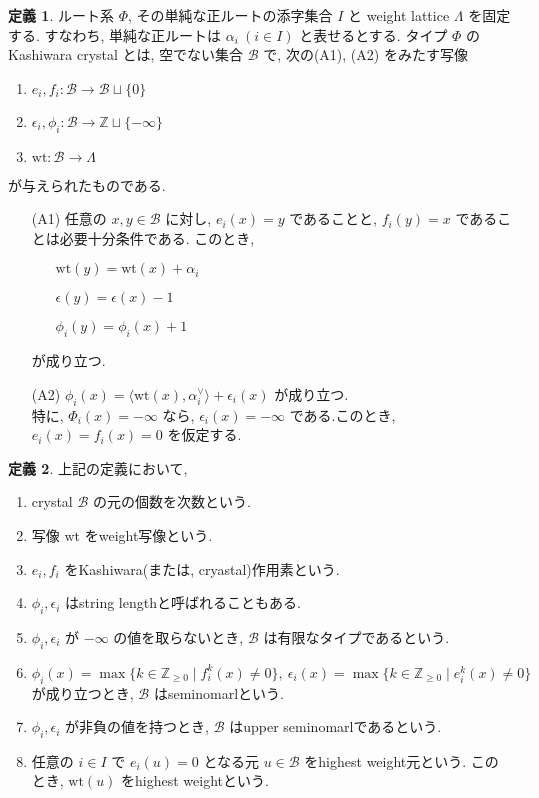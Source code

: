 \documentclass[
  a4paper, 
  12pt,
  ja=standard,
  xelatex,
  left=30truemm,
  right=30truemm,
  titlepage 
]{bxjsarticle}
\theoremstyle{definition}
\newtheorem{df}{定義}
\begin{document}
\begin{df}
  ルート系 $\Phi$, その単純な正ルートの添字集合 $I$ と weight lattice $\Lambda$ を固定する.
  すなわち, 単純な正ルートは $\alpha_i \ ( i \in I )$ と表せるとする.
  タイプ $\Phi$ の Kashiwara crystal とは, 空でない集合 $\mathscr{B}$ で, 次の(A1), (A2)
  をみたす写像
  \begin{enumerate}
    \item $e_i, f_i : \mathscr{B} \to \mathscr{B} \sqcup \{ 0 \}$
    \item $\epsilon_i, \phi_i : \mathscr{B} \to \mathbb{Z} \sqcup \{ - \infty \}$
    \item $\mathrm{wt} : \mathscr{B} \to \Lambda$
  \end{enumerate}
  が与えられたものである.
  \begin{enumerate}
    \item [(A1)] 任意の $x, y \in \mathscr{B}$ に対し, $e_i(x) = y $ であることと, $f_i(y) = x $ であることは必要十分条件である.
    このとき, 
    \begin{enumerate}
      \item [] $\mathrm{wt}(y) = \mathrm{wt}(x) + \alpha_i$
      \item [] $\epsilon(y) = \epsilon(x) - 1$
      \item [] $\phi_i(y) = \phi_i(x) + 1 $
    \end{enumerate}
    が成り立つ.
    \item [(A2)] $\phi_i(x) = \langle \mathrm{wt}(x), \alpha_i ^{ \vee } \rangle + \epsilon_i(x) $
    が成り立つ.\\
    特に, $\Phi_i(x) = - \infty$ なら, $\epsilon_i(x) = - \infty $ である.このとき, $e_i(x) = f_i(x) = 0$ を仮定する.
  \end{enumerate}
\end{df}

\begin{df} 上記の定義において,
  \begin{enumerate}
    \item crystal $\mathscr{B}$ の元の個数を次数という.
    \item 写像 $\mathrm{wt}$ をweight写像という.
    \item $e_i, f_i$ をKashiwara(または, cryastal)作用素という.
    \item $\phi_i, \epsilon_i$ はstring lengthと呼ばれることもある.
    \item $\phi_i, \epsilon_i$ が $- \infty $ の値を取らないとき, $\mathscr{B}$ は有限なタイプであるという.
    \item $\phi_i(x) = \max\{ k \in \mathbb{Z}_{\geq 0} \mid f_i^k(x) \neq 0 \}, \ \epsilon_i(x) = \max\{ k \in \mathbb{Z}_{\geq 0} \mid e_i^k(x) \neq 0 \}$ \\
    が成り立つとき, $\mathscr{B}$ はseminomarlという.
    \item $\phi_i, \epsilon_i$ が非負の値を持つとき, $\mathscr{B}$ はupper seminomarlであるという.
    \item 任意の $i \in I$ で $e_i(u) = 0$ となる元 $u \in \mathscr{B}$ をhighest weight元という. このとき, $\mathrm{wt}(u)$ をhighest weightという.
  \end{enumerate}
\end{df}
\end{document}
